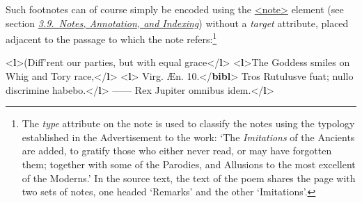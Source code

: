  Such footnotes can of course simply be encoded using the \hyperref[TEI.note]{<note>} element (see section \textit{\hyperref[CONO]{3.9.\ Notes, Annotation, and Indexing}}) without a {\itshape target} attribute, placed adjacent to the passage to which the note refers:\footnote{The {\itshape type} attribute on the note is used to classify the notes using the typology established in the Advertisement to the work: ‘The \textit{Imitations} of the Ancients are added, to gratify those who either never read, or may have forgotten them; together with some of the Parodies, and Allusions to the most excellent of the Moderns.’ In the source text, the text of the poem shares the page with two sets of notes, one headed ‘Remarks’ and the other ‘Imitations’.} \par\bgroup{}\exampleFont \begin{shaded}\noindent\mbox{}{<\textbf{l}>}(Diff'rent our parties, but with equal grace{</\textbf{l}>}\mbox{}\newline 
{<\textbf{l}>}The Goddess smiles on Whig and Tory race,{</\textbf{l}>}\mbox{}\newline 
{<\textbf{l}>}\mbox{}\newline 
{}\mbox{}\newline 
\hspace*{1em}Virg. Æn. 10.{</\textbf{bibl}>}\mbox{}\newline 
\hspace*{1em}\mbox{}\newline 
\hspace*{1em}\hspace*{1em}Tros Rutulusve fuat; nullo discrimine habebo.{</\textbf{l}>}\mbox{}\newline 
\hspace*{1em}\hspace*{1em}—— Rex Jupiter omnibus idem.{</\textbf{l}>}\mbox{}\newline 

\end{shaded}
